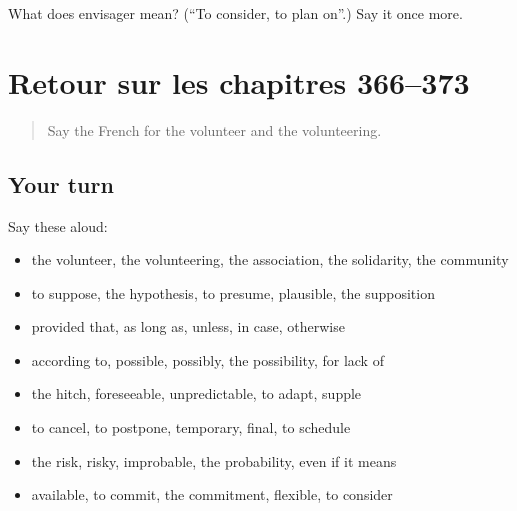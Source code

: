 \begin{tcolorbox}[breakable,colback=teal!4,colframe=teal!35!black,title={Before you move on}]
What does envisager mean? (\textquotedblleft{}To consider, to plan on\textquotedblright{}.) Say it once more.
\end{tcolorbox}
\section[(dialogue)]{Retour sur les chapitres 366–373}

\label{lesson:FR-R373-revision-366-373}



\begin{quote}
Say the French for the volunteer and the volunteering.
\end{quote}

\subsection*{Your turn}
Say these aloud:

\begin{itemize}
\raggedright
  \item the volunteer, the volunteering, the association, the solidarity, the community
  \item to suppose, the hypothesis, to presume, plausible, the supposition
  \item provided that, as long as, unless, in case, otherwise
  \item according to, possible, possibly, the possibility, for lack of
  \item the hitch, foreseeable, unpredictable, to adapt, supple
  \item to cancel, to postpone, temporary, final, to schedule
  \item the risk, risky, improbable, the probability, even if it means
  \item available, to commit, the commitment, flexible, to consider
\end{itemize}

